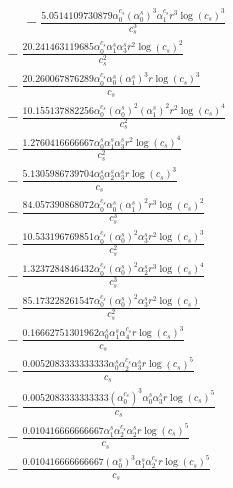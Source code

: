 \documentclass[10pt]{article}
\begin{document}
\begin{align*}
\phantom{R_{3,9}} &\phantom{={}}{}  - \frac{5.0514109730879 \alpha_{0}^{c_s} \left(\alpha_{0}^s\right)^{3} \alpha_{1}^{c_s} r^{3} \log{\left(c_{s} \right)}^{3}}{c_{s}^{3}} \\
&{}  - \frac{20.241463119685 \alpha_{0}^{c_s} \alpha_{1}^s \alpha_{3}^s r^{2} \log{\left(c_{s} \right)}^{2}}{c_{s}^{2}} \\
&{}  - \frac{20.260067876289 \alpha_{0}^{c_s} \alpha_{0}^s \left(\alpha_{1}^s\right)^{3} r \log{\left(c_{s} \right)}^{3}}{c_{s}} \\
&{}  - \frac{10.155137882256 \alpha_{0}^{c_s} \left(\alpha_{0}^s\right)^{2} \left(\alpha_{1}^s\right)^{2} r^{2} \log{\left(c_{s} \right)}^{4}}{c_{s}^{2}} \\
&{}  - \frac{1.2760416666667 \alpha_{0}^s \alpha_{1}^s \alpha_{3}^s r^{2} \log{\left(c_{s} \right)}^{4}}{c_{s}^{2}} \\
&{}  - \frac{5.1305986739704 \alpha_{0}^s \alpha_{2}^s \alpha_{3}^s r \log{\left(c_{s} \right)}^{3}}{c_{s}} \\
&{}  - \frac{84.057390868072 \alpha_{0}^{c_s} \alpha_{0}^s \left(\alpha_{1}^s\right)^{2} r^{3} \log{\left(c_{s} \right)}^{2}}{c_{s}^{3}} \\
&{}  - \frac{10.533196769851 \alpha_{0}^{c_s} \left(\alpha_{0}^s\right)^{2} \alpha_{3}^s r^{2} \log{\left(c_{s} \right)}^{3}}{c_{s}^{2}} \\
&{}  - \frac{1.3237284846432 \alpha_{0}^{c_s} \left(\alpha_{0}^s\right)^{2} \alpha_{2}^s r^{3} \log{\left(c_{s} \right)}^{4}}{c_{s}^{3}} \\
&{}  - \frac{85.173228261547 \alpha_{0}^{c_s} \left(\alpha_{0}^s\right)^{2} \alpha_{3}^s r^{2} \log{\left(c_{s} \right)}}{c_{s}^{2}} \\
&{}  - \frac{0.16662751301962 \alpha_{0}^s \alpha_{1}^s \alpha_{4}^{c_s} r \log{\left(c_{s} \right)}^{3}}{c_{s}} \\
&{}  - \frac{0.0052083333333333 \alpha_{0}^s \alpha_{2}^{c_s} \alpha_{3}^s r \log{\left(c_{s} \right)}^{5}}{c_{s}} \\
&{}  - \frac{0.0052083333333333 \left(\alpha_{0}^{c_s}\right)^{3} \alpha_{0}^s \alpha_{3}^s r \log{\left(c_{s} \right)}^{5}}{c_{s}} \\
&{}  - \frac{0.010416666666667 \alpha_{1}^s \alpha_{2}^{c_s} \alpha_{2}^s r \log{\left(c_{s} \right)}^{5}}{c_{s}} \\
&{}  - \frac{0.010416666666667 \left(\alpha_{0}^s\right)^{3} \alpha_{1}^s \alpha_{2}^{c_s} r \log{\left(c_{s} \right)}^{5}}{c_{s}} \\

\end{align*}
\end{document}
